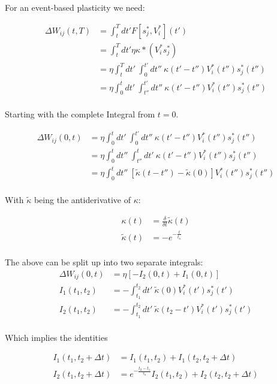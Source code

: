 \documentclass[12pt,a4paper,titlepage]{report}
\begin{document}
For an event-based plasticity we need:

\begin{align}
\Delta W_{ij}(t,T) &= \int_t^T dt' F[s_j^\ast , V_i^\ast ](t')\\
 &= \int_t^T dt' \eta \kappa \ast (V_i^\ast s_j^\ast)\\
 &= \eta \int_t^T dt' \  \int_0^{t'} dt'' \ \kappa(t'-t'') V_i^\ast (t'') s_j^\ast (t'')\\
 &= \eta \int_0^t dt' \  \int_{t''}^{t'} dt'' \ \kappa(t'-t'') V_i^\ast (t'') s_j^\ast (t'')\\
\end{align}


Starting with the complete Integral from $t=0$.

\begin{align*}
\Delta W_{ij}(0,t) &=\eta \int_0^t dt' \  \int_0^{t'} dt'' \ \kappa(t'-t'') V_i^\ast (t'') s_j^\ast (t'')\\
 &= \eta \int_0^t dt'' \  \int_{t''}^{t} dt' \ \kappa(t'-t'') V_i^\ast (t'') s_j^\ast (t'')\\
  &= \eta \int_0^t dt'' \  \left[ \tilde{\kappa}(t-t'') - \tilde{\kappa}(0) \right] V_i^\ast (t'') s_j^\ast (t'')\\
\end{align*}

With $\tilde{\kappa}$ being the antiderivative of $\kappa$: 

\begin{align*}
\kappa(t) &= \frac{\delta}{\delta t} \tilde{\kappa}(t)\\
\tilde{\kappa}(t) &= - e^{-\frac{t}{t_{\kappa}}} \\
\end{align*}

The above can be split up into two separate integrals:
\begin{align*}
\Delta W_{ij}(0,t) &=\eta \left[ -I_2 (0, t) + I_1(0,t) \right] \\
I_1(t_1, t_2) &= - \int_{t_1}^{t_2} dt' \ \tilde{\kappa} (0) V_i^\ast (t') s_j^\ast (t')\\
I_2(t_1, t_2) &= - \int_{t_1}^{t_2} dt' \ \tilde{\kappa} (t_2 - t') V_i^\ast (t') s_j^\ast (t')\\
\end{align*}

Which implies the identities 

\begin{align*}
I_1(t_1, t_2 + \Delta t) &= I_1 (t_1, t_2) + I_1 (t_2, t_2 + \Delta t)\\
I_2(t_1, t_2 + \Delta t) &= e^{- \frac{t_2 - t_1}{\tau_{\kappa}}} I_2 (t_1, t_2) + I_2 (t_2, t_2 + \Delta t)
\end{align*}
\end{document}
